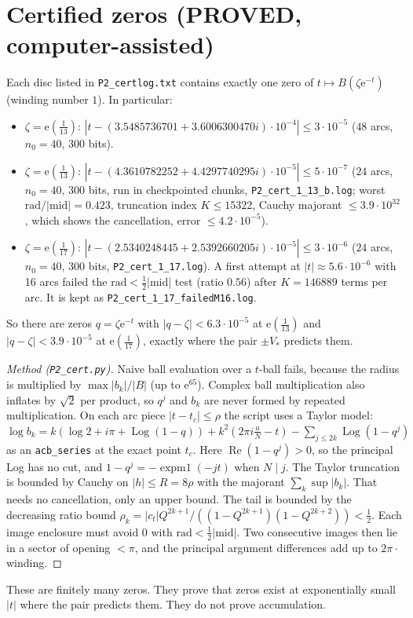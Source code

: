 \documentclass[11pt]{article}
\theoremstyle{remark}\newtheorem{remark}[theorem]{Remark}
\newcommand{\e}{\mathrm{e}}
\begin{document}
\section{Certified zeros (PROVED, computer-assisted)}
\begin{proposition}\label{prop:cert}
Each disc listed in \texttt{P2\_certlog.txt} contains exactly one zero of $t\mapsto B(\zeta\e^{-t})$ (winding number $1$). In particular:
\begin{itemize}
\item $\zeta=\e(\frac1{13})$: $|t-(3.5485736701+3.6006300470i)\cdot10^{-4}|\le3\cdot10^{-5}$ ($48$ arcs, $n_0=40$, 300 bits).
\item $\zeta=\e(\frac1{13})$: $|t-(4.3610782252+4.4297740295i)\cdot10^{-5}|\le5\cdot10^{-7}$ ($24$ arcs, $n_0=40$, 300 bits, run in
checkpointed chunks, \texttt{P2\_cert\_1\_13\_b.log}; worst $\mathrm{rad}/|\mathrm{mid}|=0.423$, truncation index $K\le15322$, Cauchy majorant
$\le3.9\cdot10^{32}$, which shows the cancellation, error $\le4.2\cdot10^{-5}$).
\item $\zeta=\e(\frac1{17})$: $|t-(2.5340248445+2.5392660205i)\cdot10^{-5}|\le3\cdot10^{-6}$ ($24$ arcs, $n_0=40$, 300 bits,
\texttt{P2\_cert\_1\_17.log}). A first attempt at $|t|\approx5.6\cdot10^{-6}$ with 16 arcs failed the $\mathrm{rad}<\frac12|\mathrm{mid}|$
test (ratio $0.56$) after $K=146889$ terms per arc. It is kept as \texttt{P2\_cert\_1\_17\_failedM16.log}.
\end{itemize}
So there are zeros $q=\zeta\e^{-t}$ with $|q-\zeta|<6.3\cdot10^{-5}$ at $\e(\frac1{13})$ and $|q-\zeta|<3.9\cdot10^{-5}$ at $\e(\frac1{17})$,
exactly where the pair $\pm V_*$ predicts them.
\end{proposition}
\begin{proof}[Method (\texttt{P2\_cert.py})]
Naive ball evaluation over a $t$-ball fails, because the radius is multiplied by $\max|b_k|/|B|$ (up to $\e^{65}$). Complex ball
multiplication also inflates by $\sqrt2$ per product, so $q^j$ and $b_k$ are never formed by repeated multiplication. On each arc piece
$|t-t_c|\le\rho$ the script uses a Taylor model:
$\log b_k=k(\log2+i\pi+\operatorname{Log}(1-q))+k^2(2\pi i\frac aN-t)-\sum_{j\le2k}\operatorname{Log}(1-q^j)$ as an \texttt{acb\_series} at the exact point $t_c$.
Here $\operatorname{Re}(1-q^j)>0$, so the principal Log has no cut, and $1-q^j=-\operatorname{expm1}(-jt)$ when $N\mid j$.
The Taylor truncation is bounded by Cauchy on $|h|\le R=8\rho$ with the majorant $\sum_k\sup|b_k|$. That needs no cancellation, only
an upper bound. The tail is bounded by the decreasing ratio bound $\rho_k=|c_t|Q^{2k+1}/((1-Q^{2k+1})(1-Q^{2k+2}))<\frac12$. Each
image enclosure must avoid $0$ with $\mathrm{rad}<\frac12|\mathrm{mid}|$. Two consecutive images then lie in a sector of opening $<\pi$,
and the principal argument differences add up to $2\pi\cdot$winding.
\end{proof}
These are finitely many zeros. They prove that zeros exist at exponentially small $|t|$ where the pair predicts them. They do not prove
accumulation.
\end{document}
